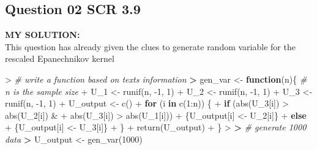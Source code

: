 \documentclass[
]{article}
\newenvironment{Shaded}{\begin{snugshade}}{\end{snugshade}}
\newcommand{\CommentTok}[1]{\textcolor[rgb]{0.56,0.35,0.01}{\textit{#1}}}
\newcommand{\ControlFlowTok}[1]{\textcolor[rgb]{0.13,0.29,0.53}{\textbf{#1}}}
\newcommand{\DecValTok}[1]{\textcolor[rgb]{0.00,0.00,0.81}{#1}}
\newcommand{\ErrorTok}[1]{\textcolor[rgb]{0.64,0.00,0.00}{\textbf{#1}}}
\newcommand{\FunctionTok}[1]{\textcolor[rgb]{0.00,0.00,0.00}{#1}}
\newcommand{\NormalTok}[1]{#1}
\newcommand{\OtherTok}[1]{\textcolor[rgb]{0.56,0.35,0.01}{#1}}
\newcommand{\SpecialCharTok}[1]{\textcolor[rgb]{0.00,0.00,0.00}{#1}}
\begin{document}
\hypertarget{question-02-scr-3.9}{%
\subsection{Question 02 SCR 3.9}\label{question-02-scr-3.9}}

\textbf{MY SOLUTION:}\\
This question has already given the clues to generate random variable
for the rescaled Epanechnikov kernel

\begin{Shaded}
\begin{Highlighting}[]
\SpecialCharTok{\textgreater{}} \CommentTok{\# write a function based on text\textquotesingle{}s information}
\ErrorTok{\textgreater{}}\NormalTok{ gen\_var }\OtherTok{\textless{}{-}} \ControlFlowTok{function}\NormalTok{(n)\{ }\CommentTok{\# n is the sample size}
\SpecialCharTok{+}\NormalTok{   U\_1 }\OtherTok{\textless{}{-}} \FunctionTok{runif}\NormalTok{(n, }\SpecialCharTok{{-}}\DecValTok{1}\NormalTok{, }\DecValTok{1}\NormalTok{)}
\SpecialCharTok{+}\NormalTok{   U\_2 }\OtherTok{\textless{}{-}} \FunctionTok{runif}\NormalTok{(n, }\SpecialCharTok{{-}}\DecValTok{1}\NormalTok{, }\DecValTok{1}\NormalTok{)}
\SpecialCharTok{+}\NormalTok{   U\_3 }\OtherTok{\textless{}{-}} \FunctionTok{runif}\NormalTok{(n, }\SpecialCharTok{{-}}\DecValTok{1}\NormalTok{, }\DecValTok{1}\NormalTok{)}
\SpecialCharTok{+}\NormalTok{   U\_output }\OtherTok{\textless{}{-}} \FunctionTok{c}\NormalTok{()}
\SpecialCharTok{+}   \ControlFlowTok{for}\NormalTok{ (i }\ControlFlowTok{in} \FunctionTok{c}\NormalTok{(}\DecValTok{1}\SpecialCharTok{:}\NormalTok{n)) \{}
\SpecialCharTok{+}     \ControlFlowTok{if}\NormalTok{ (}\FunctionTok{abs}\NormalTok{(U\_3[i]) }\SpecialCharTok{\textgreater{}} \FunctionTok{abs}\NormalTok{(U\_2[i]) }\SpecialCharTok{\&} 
\SpecialCharTok{+}         \FunctionTok{abs}\NormalTok{(U\_3[i]) }\SpecialCharTok{\textgreater{}} \FunctionTok{abs}\NormalTok{(U\_1[i]))}
\SpecialCharTok{+}\NormalTok{       \{U\_output[i] }\OtherTok{\textless{}{-}}\NormalTok{ U\_2[i]\} }
\SpecialCharTok{+}     \ControlFlowTok{else} 
\SpecialCharTok{+}\NormalTok{       \{U\_output[i] }\OtherTok{\textless{}{-}}\NormalTok{ U\_3[i]\}}
\SpecialCharTok{+}\NormalTok{   \}}
\SpecialCharTok{+}   \FunctionTok{return}\NormalTok{(U\_output)}
\SpecialCharTok{+}\NormalTok{ \}}
\SpecialCharTok{\textgreater{}} 
\ErrorTok{\textgreater{}} \CommentTok{\# generate 1000 data}
\ErrorTok{\textgreater{}}\NormalTok{ U\_output }\OtherTok{\textless{}{-}} \FunctionTok{gen\_var}\NormalTok{(}\DecValTok{1000}\NormalTok{)}

\end{Highlighting}
\end{Shaded}
\end{document}
